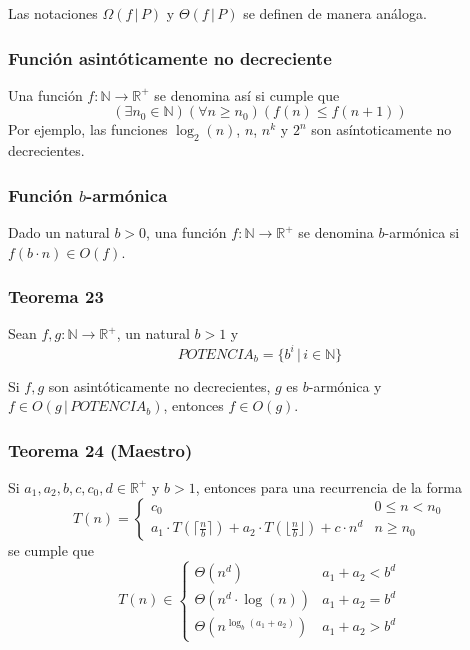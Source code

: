 \begin{multicols}{2}
    Las notaciones $\Omega(f \,|\,P)$ y $\Theta(f \,|\, P)$ se definen de manera análoga.
    
    \subsubsection*{Función asintóticamente no decreciente}
    Una función $f: \mathbb{N} \rightarrow \mathbb{R}^+$ se denomina así si cumple que
    $$
    (\exists n_0 \in \mathbb{N})(\forall n \geq n_0)(f(n) \leq f(n + 1))
    $$
    Por ejemplo, las funciones $\log_2(n)$, $n$, $n^k$ y $2^n$ son asíntoticamente no decrecientes.
    
    \subsubsection*{Función $b$-armónica}
    Dado un natural $b > 0$, una función $f: \mathbb{N} \rightarrow \mathbb{R}^+$ se denomina $b$-armónica si $f(b \cdot n) \in O(f)$.
    
    \subsubsection*{Teorema 23}
    Sean $f,g: \mathbb{N} \rightarrow \mathbb{R}^+$, un natural $b > 1$ y
    $$
    POTENCIA_b = \{ b^i \,|\, i \in \mathbb{N}\}
    $$
    
    Si $f,g$ son asintóticamente no decrecientes, $g$ es $b$-armónica y $f \in O(g \,|\, POTENCIA_b)$, entonces $f \in O(g)$.
    
    \subsubsection*{Teorema 24 (Maestro)}
    Si $a_1, a_2, b, c, c_0, d \in \mathbb{R}^+$ y $b > 1$, entonces para una recurrencia de la forma
    $$
    T(n) = \begin{cases}
        c_0 &0 \leq n < n_0 \\
        a_1 \cdot T(\lceil\frac{n}{b}\rceil) + a_2 \cdot T(\lfloor\frac{n}{b}\rfloor) + c \cdot n^d &n \geq n_0
    \end{cases}
    $$
    se cumple que
    $$
    T(n) \in \begin{cases}
        \Theta(n^d) &a_1 + a_2 < b^d \\
        \Theta(n^d \cdot \log(n)) &a_1 + a_2 = b^d \\
        \Theta(n^{\log_b(a_1 + a_2)}) &a_1 + a_2 > b^d
    \end{cases}
    $$
    

\end{multicols}
